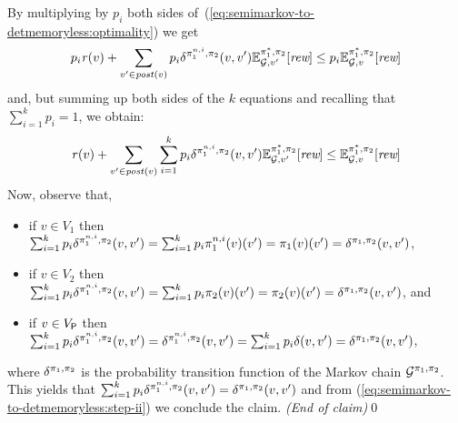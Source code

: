 \begin{myproof}
\begin{proofofclaim}
    By multiplying by $p_i$ both sides of~(\ref{eq:semimarkov-to-detmemoryless:optimality}) we get
    \begin{equation*}\label{eq:semimarkov-to-detmemoryless:step-i}
      p_i \mathit{r}(v) + \sum_{v' \in \mathit{post}(v)} p_i \delta^{\pi_{1}^{n,i},\pi_{2}}(v, v') \mathbb{E}^{\pi^*_{1}, \pi_{2}}_{\mathcal{G},v'}[\textit{rew}] \leq p_i \mathbb{E}^{\pi^*_{1}, \pi_{2}}_{\mathcal{G},v}[\textit{rew}]
    \end{equation*}
    and, but summing up both sides of the $k$ equations and recalling that
    $\sum_{i=1}^kp_i =1$, we obtain:
    \begin{equation}\label{eq:semimarkov-to-detmemoryless:step-ii}
      \mathit{r}(v) + \sum_{v' \in \mathit{post}(v)}\sum_{i=1}^k p_i \delta^{\pi_{1}^{n,i},\pi_{2}}(v, v') \mathbb{E}^{\pi^*_{1}, \pi_{2}}_{\mathcal{G},v'}[\textit{rew}] \leq \mathbb{E}^{\pi^*_{1}, \pi_{2}}_{\mathcal{G},v}[\textit{rew}]
    \end{equation}
    Now, observe that,
    \begin{itemize}
    \item%
    if $v\in V_1$ then
    $\sum_{i=1}^k p_i \delta^{\pi_{1}^{n,i},\pi_{2}}(v, v') = \sum_{i=1}^k p_i \pi_{1}^{n,i}(v)(v') = \pi_{1}(v)(v') = \delta^{\pi_{1},\pi_{2}}(v, v')$,
    \item%
    if $v\in V_2$ then
    $\sum_{i=1}^k p_i \delta^{\pi_{1}^{n,i},\pi_{2}}(v, v') = \sum_{i=1}^k p_i \pi_{2}(v)(v') = \pi_{2}(v)(v') = \delta^{\pi_{1},\pi_{2}}(v, v')$, and 
    \item%
    if $v\in V_{\mathsf{P}}$ then
    $\sum_{i=1}^k p_i \delta^{\pi_{1}^{n,i},\pi_{2}}(v, v') = \delta^{\pi_{1}^{n,i},\pi_{2}}(v, v') = \sum_{i=1}^k p_i \delta(v,v') = \delta^{\pi_{1},\pi_{2}}(v, v')$,
    \end{itemize}
    where $\delta^{\pi_{1},\pi_{2}}$ is the probability transition
    function of the Markov chain $\mathcal{G}^{\pi_{1},\pi_{2}}$.
    This yields that
    $\sum_{i=1}^k p_i \delta^{\pi_{1}^{n,i},\pi_{2}}(v, v') = \delta^{\pi_{1},\pi_{2}}(v, v')$
    and from (\ref{eq:semimarkov-to-detmemoryless:step-ii}) we conclude the claim.
    \hfill\emph{(End of claim)}\qed
  \end{proofofclaim}


\end{myproof}
